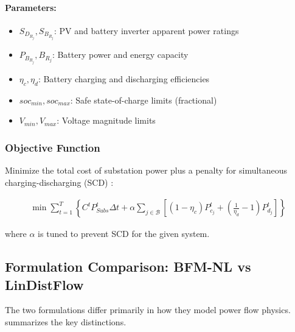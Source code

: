 \paragraph{Parameters:}
\begin{itemize}
    \item $S_{D_{R_j}}, S_{B_{R_j}}$: PV and battery inverter apparent power ratings
    \item $P_{B_{R_j}}, B_{R_j}$: Battery power and energy capacity
    \item $\eta_c, \eta_d$: Battery charging and discharging efficiencies
    \item $soc_{min}, soc_{max}$: Safe state-of-charge limits (fractional)
    \item $V_{min}, V_{max}$: Voltage magnitude limits
\end{itemize}

\subsubsection{Objective Function}

Minimize the total cost of substation power plus a penalty for simultaneous charging-discharging (SCD) \cite{Nazir2021Sep}:

\begin{align}
    \min \sum_{t = 1}^{T} \left\{ C^t P^t_{Subs} \Delta t + \alpha \sum_{j \in \mathcal{B}} \left[ (1-\eta_c)P^t_{c_j} + \left( \frac{1}{\eta_d} - 1 \right) P^t_{d_j} \right] \right\}
    \label{eq:mpopf-tradeoffs-objective}
\end{align}

where $\alpha$ is tuned to prevent SCD for the given system.

\subsection{Formulation Comparison: BFM-NL vs LinDistFlow}

The two formulations differ primarily in how they model power flow physics.  summarizes the key distinctions.

